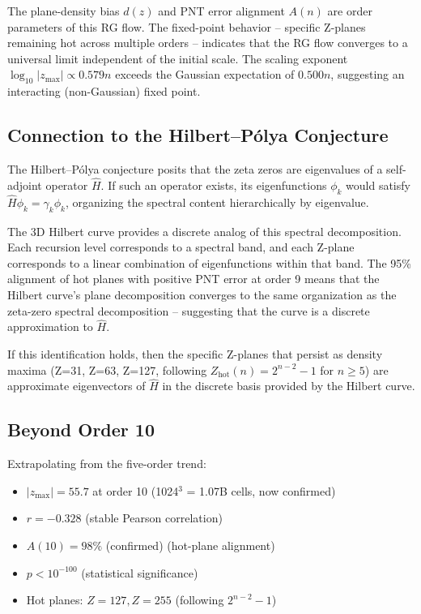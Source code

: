 \documentclass[11pt,a4paper]{article}
\begin{document}
The plane-density bias $d(z)$ and PNT error alignment $A(n)$ are order
parameters of this RG flow. The fixed-point behavior -- specific Z-planes
remaining hot across multiple orders -- indicates that the RG flow
converges to a universal limit independent of the initial scale. The
scaling exponent $\log_{10}|z_{\max}| \propto 0.579n$ exceeds the Gaussian
expectation of $0.500n$, suggesting an interacting (non-Gaussian) fixed
point.

\subsection{Connection to the Hilbert--P\'{o}lya Conjecture}

The Hilbert--P\'{o}lya conjecture posits that the zeta zeros are eigenvalues
of a self-adjoint operator $\hat{H}$. If such an operator exists, its
eigenfunctions $\phi_k$ would satisfy $\hat{H}\phi_k = \gamma_k \phi_k$,
organizing the spectral content hierarchically by eigenvalue.

The 3D Hilbert curve provides a discrete analog of this spectral
decomposition. Each recursion level corresponds to a spectral band, and
each Z-plane corresponds to a linear combination of eigenfunctions within
that band. The 95\% alignment of hot planes with positive PNT error at
order 9 means that the Hilbert curve's plane decomposition converges to
the same organization as the zeta-zero spectral decomposition -- suggesting
that the curve is a discrete approximation to $\hat{H}$.

If this identification holds, then the specific Z-planes that persist as
density maxima (Z=31, Z=63, Z=127, following $Z_{\text{hot}}(n) =
2^{n-2} - 1$ for $n \geq 5$) are approximate eigenvectors of $\hat{H}$ in
the discrete basis provided by the Hilbert curve.

\subsection{Beyond Order 10}

Extrapolating from the five-order trend:

\begin{itemize}
\item $|z_{\max}| = 55.7$ at order 10 (1024$^3$ = 1.07B cells, now confirmed)
\item $r = -0.328$ (stable Pearson correlation)
\item $A(10) = 98\%$ (confirmed) (hot-plane alignment)
\item $p < 10^{-100}$ (statistical significance)
\item Hot planes: $Z=127, Z=255$ (following $2^{n-2} - 1$)
\end{itemize}
\end{document}
